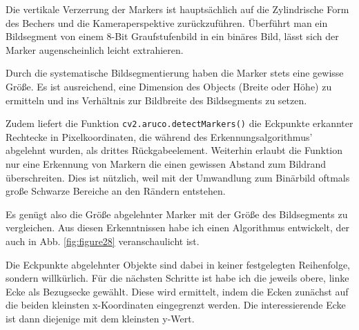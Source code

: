     Die vertikale Verzerrung der Markers ist hauptsächlich auf die Zylindrische Form des Bechers und die Kameraperspektive zurückzuführen. 
    Überführt man ein Bildsegment von einem 8-Bit Graufstufenbild in ein binäres Bild, lässt sich der Marker augenscheinlich leicht extrahieren. 
    
    Durch die systematische Bildsegmentierung haben die Marker stets eine gewisse Größe. 
    Es ist ausreichend, eine Dimension des Objects (Breite oder Höhe) zu ermitteln und ins Verhältnis zur Bildbreite des Bildsegments zu setzen.

    Zudem liefert die Funktion \verb|cv2.aruco.detectMarkers()| die Eckpunkte erkannter \\Rechtecke in Pixelkoordinaten, die während des Erkennungsalgorithmus' abgelehnt wurden, als drittes Rückgabeelement. 
    Weiterhin erlaubt die Funktion nur eine Erkennung von Markern die einen gewissen Abstand zum Bildrand überschreiten. 
    Dies ist nützlich, weil mit der Umwandlung zum Binärbild oftmals große Schwarze Bereiche an den Rändern entstehen.
    
    Es genügt also die Größe abgelehnter Marker mit der Größe des Bildsegments zu vergleichen. 
    Aus diesen Erkenntnissen habe ich einen Algorithmus entwickelt, der auch in Abb. \ref{fig:figure28} veranschaulicht ist.

    Die Eckpunkte abgelehnter Objekte sind dabei in keiner festgelegten Reihenfolge, sondern willkürlich. 
    Für die nächsten Schritte ist habe ich die jeweils obere, linke Ecke als Bezugsecke gewählt.
    Diese wird ermittelt, indem die Ecken zunächst auf die beiden kleinsten x-Koordinaten eingegrenzt werden. 
    Die interessierende Ecke ist dann diejenige mit dem kleinsten y-Wert.

